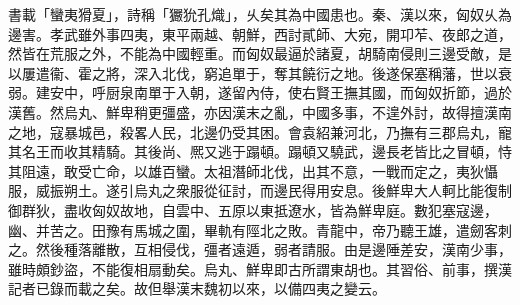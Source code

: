 
\begin{pinyinscope}
書載「蠻夷猾夏」，詩稱「玁狁孔熾」，乆矣其為中國患也。秦、漢以來，匈奴乆為邊害。孝武雖外事四夷，東平兩越、朝鮮，西討貳師、大宛，開卭苲、夜郎之道，然皆在荒服之外，不能為中國輕重。而匈奴最逼於諸夏，胡騎南侵則三邊受敵，是以屢遣衞、霍之將，深入北伐，窮追單于，奪其饒衍之地。後遂保塞稱藩，世以衰弱。建安中，呼厨泉南單于入朝，遂留內侍，使右賢王撫其國，而匈奴折節，過於漢舊。然烏丸、鮮卑稍更彊盛，亦因漢末之亂，中國多事，不遑外討，故得擅漢南之地，寇暴城邑，殺畧人民，北邊仍受其困。會袁紹兼河北，乃撫有三郡烏丸，寵其名王而收其精騎。其後尚、熈又逃于蹋頓。蹋頓又驍武，邊長老皆比之冒頓，恃其阻遠，敢受亡命，以雄百蠻。太祖潛師北伐，出其不意，一戰而定之，夷狄懾服，威振朔土。遂引烏丸之衆服從征討，而邊民得用安息。後鮮卑大人軻比能復制御群狄，盡收匈奴故地，自雲中、五原以東抵遼水，皆為鮮卑庭。數犯塞寇邊，幽、并苦之。田豫有馬城之圍，畢軌有陘北之敗。青龍中，帝乃聽王雄，遣劒客刺之。然後種落離散，互相侵伐，彊者遠遁，弱者請服。由是邊陲差安，漢南少事，雖時頗鈔盜，不能復相扇動矣。烏丸、鮮卑即古所謂東胡也。其習俗、前事，撰漢記者已錄而載之矣。故但舉漢末魏初以來，以備四夷之變云。


\end{pinyinscope}
